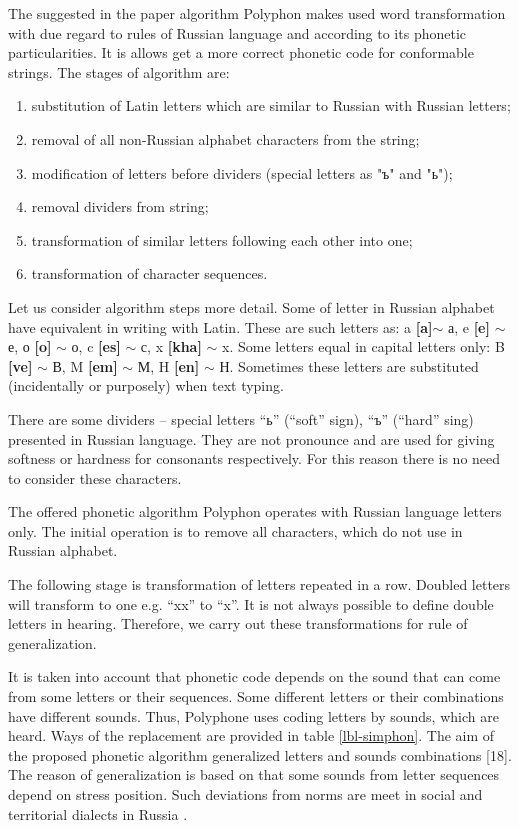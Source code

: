\documentclass[conference,a4paper]{IEEEtran}
\begin{document}
The suggested in the paper algorithm Polyphon makes used word transformation with due regard to rules of Russian language and according to its phonetic particularities. It is allows get a more correct phonetic code for conformable strings. The stages of algorithm are:

\begin{enumerate}
\item substitution of Latin letters which are similar to Russian with Russian letters;
\item removal of all non-Russian alphabet characters from the string;
\item modification of letters before dividers (special letters as "ъ" and "ь");
\item removal dividers from string;
\item transformation of similar letters following each other into one;
\item transformation of character sequences.
\end{enumerate}

Let us consider algorithm steps more detail. Some of letter in Russian alphabet have equivalent in writing with Latin. These are such letters as: a \textbf{[a]}$\sim$ а, e \textbf{[e]} $\sim$ е, о \textbf{[o]} $\sim$ о, c \textbf{[es]} $\sim$ с, x \textbf{[kha]} $\sim$ x. Some letters equal in capital letters only: B \textbf{[ve]} $\sim$ В, M \textbf{[em]} $\sim$ М, H \textbf{[en]} $\sim$ Н. Sometimes these letters are substituted (incidentally or purposely) when text typing.

There are some dividers – special letters “ь” (“soft” sign), “ъ” (“hard” sing) presented in Russian language. They are not pronounce and are used for giving softness or hardness for consonants respectively. For this reason there is no need to consider these characters.

The offered phonetic algorithm Polyphon operates with Russian language letters only. The initial operation is to remove all characters, which do not use in Russian alphabet.

The following stage is transformation of letters repeated in a row. Doubled letters will transform to one e.g. “xx” to “x”. It is not always possible to define double letters in hearing. Therefore, we carry out these transformations for rule of generalization.

It is taken into account that phonetic code depends on the sound that can come from some letters or their sequences. Some different letters or their combinations have different sounds. Thus, Polyphone uses coding letters by sounds, which are heard. Ways of the replacement are provided in table \ref{lbl-simphon}. The aim of the proposed phonetic algorithm generalized letters and sounds combinations [18]. The reason of generalization is based on that some sounds from letter sequences depend on stress position.  Such deviations from norms are meet in social and territorial dialects in Russia \cite{Zhirmunsky-1936}.
\end{document}
